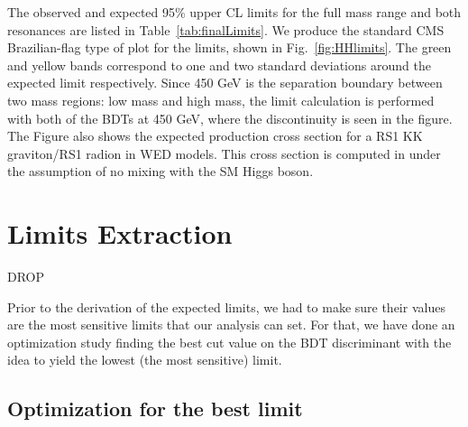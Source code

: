 The observed and expected 95\% upper CL limits for the full mass range
and both resonances are listed in Table~\ref{tab:finalLimits}. We produce the standard CMS Brazilian-flag type of plot for the limits, shown in Fig.~\ref{fig:HHlimits}. The green and yellow
bands correspond to one and two standard deviations around
the expected limit respectively. Since 450 GeV is the separation boundary between two mass regions: low mass and high mass, the limit calculation is performed with both of the BDTs at 450 GeV, where the discontinuity is
seen in the figure. The Figure also shows the expected production
cross section for a RS1 KK graviton/RS1 radion in WED models. %
This cross section is computed in \cite{Oliveira:2014kla}
under the assumption of no mixing with the SM Higgs boson.











\section{Limits Extraction}
DROP

\label{sec:limits}

Prior to the derivation of the expected limits, we had to make sure their values are the most sensitive limits that our analysis can set. For that, we have done an optimization study finding the best cut value on the BDT discriminant with the idea to yield the lowest (the most sensitive) limit. 



\subsection{Optimization for the best limit}


